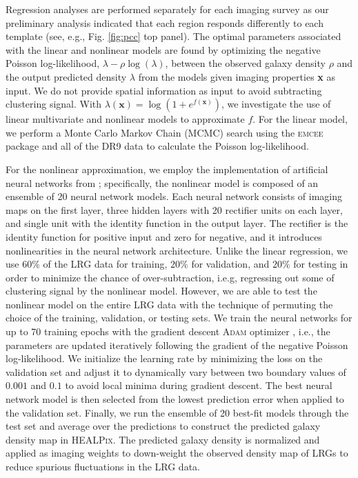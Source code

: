 Regression analyses are performed separately for each imaging survey as our preliminary analysis indicated that each region responds differently to each template (see, e.g., Fig. \ref{fig:pcc} top panel). The optimal parameters associated with the linear and nonlinear models are found by optimizing the negative Poisson log-likelihood, $\lambda - \rho \log(\lambda)$, between the observed galaxy density $\rho$ and the output predicted density $\lambda$ from the models given imaging properties \textbf{x} as input. We do not provide spatial information as input to avoid subtracting clustering signal. With $\lambda(\textbf{x}) = \log (1+e^{f(\textbf{x})})$, we investigate the use of linear multivariate and nonlinear models to approximate $f$. For the linear model, we perform a Monte Carlo Markov Chain (MCMC) search using the \textsc{emcee} package \citep{2013PASP..125..306F} and all of the DR9 data to calculate the Poisson log-likelihood. 

For the nonlinear approximation, we employ the implementation of artificial neural networks from \cite{rezaie2021primordial}; specifically, the nonlinear model is composed of an ensemble of 20 neural network models. Each neural network consists of imaging maps on the first layer, three hidden layers with 20 rectifier units on each layer, and single unit with the identity function in the output layer. The rectifier is the identity function for positive input and zero for negative, and it introduces nonlinearities in the neural network architecture. Unlike the linear regression, we use $60\%$ of the LRG data for training, $20\%$ for validation, and $20\%$ for testing in order to minimize the chance of over-subtraction, i.e.g, regressing out some of clustering signal by the nonlinear model. However, we are able to test the nonlinear model on the entire LRG data with the technique of permuting the choice of the training, validation, or testing sets. We train the neural networks for up to 70 training epochs with the gradient descent \textsc{Adam} optimizer \citep{2017arXiv171105101L}, i.e., the parameters are updated iteratively following the gradient of the negative Poisson log-likelihood. We initialize the learning rate by minimizing the loss on the validation set and adjust it to dynamically vary between two boundary values of $0.001$ and $0.1$ to avoid local minima during gradient descent. The best neural network model is then selected from the lowest prediction error when applied to the validation set. Finally, we run the ensemble of 20 best-fit models through the test set and average over the predictions to construct the predicted galaxy density map in \textsc{HEALPix}. The predicted galaxy density is normalized and applied as imaging weights to down-weight the observed density map of LRGs to reduce spurious fluctuations in the LRG data. 

